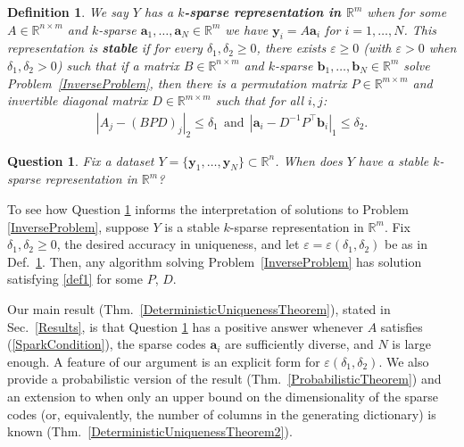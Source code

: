 \documentclass[journal, twocolumn]{IEEEtran}
\newtheorem{question}{Question}
\newtheorem{definition}{Definition}
\begin{document}
\begin{definition}\label{Uniqueness}
We say $Y$ has a \textbf{$k$-sparse representation in $\mathbb{R}^m$} when for some $A \in \mathbb{R}^{n \times m}$ and $k$-sparse $\mathbf{a}_1, \ldots, \mathbf{a}_N \in \mathbb{R}^m$ we have $\mathbf{y}_i = A\mathbf{a}_i$ for $i = 1, \ldots, N$. This representation is \textbf{stable} if for every $\delta_1, \delta_2 \geq 0$, there exists $\varepsilon \geq 0$ (with $\varepsilon > 0$ when  $\delta_1, \delta_2 > 0$) such that if a matrix $B \in \mathbb{R}^{n \times m}$ and $k$-sparse $\mathbf{b}_1, \ldots, \mathbf{b}_N \in \mathbb{R}^m$ 
solve Problem~\ref{InverseProblem},
then there is a permutation matrix $P \in \mathbb{R}^{m \times m}$ and invertible diagonal matrix $D \in \mathbb{R}^{m \times m}$ such that for all $i,j$:
\begin{align}\label{def1}
|A_j - (BPD)_j|_2 \leq \delta_1 \ \ \text{and} \ \ |\mathbf{a}_i - D^{-1}P^{\top}\mathbf{b}_i|_1 \leq \delta_2.
\end{align}
\end{definition}

\begin{question}\label{DUTproblem}
Fix a dataset $Y = \{\mathbf{y}_1, \ldots, \mathbf{y}_N \} \subset \mathbb{R}^n$.  When does $Y$ have a stable $k$-sparse representation in $\mathbb{R}^m$?
\end{question}

To see how Question \ref{DUTproblem} informs the interpretation of solutions to Problem \ref{InverseProblem}, suppose $Y$ is a stable $k$-sparse representation in $\mathbb{R}^m$. Fix $\delta_1, \delta_2 \geq 0$, the desired accuracy in uniqueness, and let $\varepsilon = \varepsilon(\delta_1, \delta_2)$ be as in Def.~\ref{Uniqueness}. 
Then, any algorithm solving Problem~\ref{InverseProblem} has solution satisfying \eqref{def1} for some $P$, $D$. 

Our main result (Thm.~\ref{DeterministicUniquenessTheorem}), stated in Sec.~\ref{Results}, is that Question \ref{DUTproblem} has a positive answer whenever $A$ satisfies (\ref{SparkCondition}), the sparse codes $\mathbf{a}_i$ are sufficiently diverse, and $N$ is large enough.  A feature of our argument is an explicit form for $\varepsilon(\delta_1, \delta_2)$.  We also provide a probabilistic version of the result (Thm.~\ref{ProbabilisticTheorem}) and an extension to when only an upper bound on the dimensionality of the sparse codes (or, equivalently, the number of columns in the generating dictionary) is known (Thm.~\ref{DeterministicUniquenessTheorem2}). 
\end{document}
